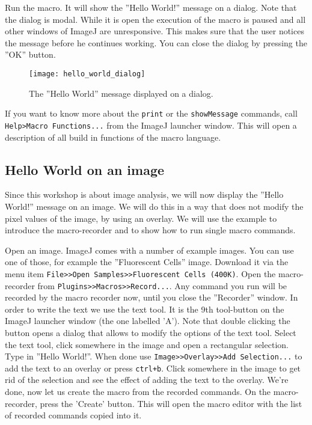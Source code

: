 Run the macro. It will show the ''Hello World!'' message on a dialog. Note that the dialog is modal. While it is open the execution of the macro is paused and all other windows of ImageJ are unresponsive. This makes sure that the user notices the message before he continues working. You can close the dialog by pressing the ''OK'' button.

\begin{figure}[h!]
  \centering
    \texttt{[image: hello\_world\_dialog]}
    \caption[A message on a dialog]{The ''Hello World'' message displayed on a dialog.}
    \label{dialog_window}
\end{figure}

If you want to know more about the {\tt print} or the {\tt showMessage} commands, call {\tt Help>Macro Functions...} from the ImageJ launcher window. This will open a description of all build in functions of the macro language.

\subsection{Hello World on an image}

Since this workshop is about image analysis, we will now display the ''Hello World!'' message on an image. We will do this in a way that does not modify the pixel values of the image, by using an overlay. We will use the example to introduce the macro-recorder and to show how to run single macro commands.

Open an image. ImageJ comes with a number of example images. You can use one of those, for example the ''Fluorescent Cells'' image. Download it via the menu item {\tt File>>Open Samples>>Fluorescent Cells (400K)}. Open the macro-recorder from {\tt Plugins>>Macros>>Record...}. Any command you run will be recorded by the macro recorder now, until you close the ''Recorder'' window. In order to write the text we use the text tool. It is the 9th tool-button on the ImageJ launcher window (the one labelled 'A'). Note that double clicking the button opens a dialog that allows to modify the options of the text tool. Select the text tool, click somewhere in the image and open a rectangular selection. Type in ''Hello World!''. When done use {\tt Image>>Overlay>>Add Selection...} to add the text to an overlay or press {\tt ctrl+b}. Click somewhere in the image to get rid of the selection and see the effect of adding the text to the overlay. We're done, now let us create the macro from the recorded commands. On the macro-recorder, press the 'Create' button. This will open the macro editor with the list of recorded commands copied into it.

